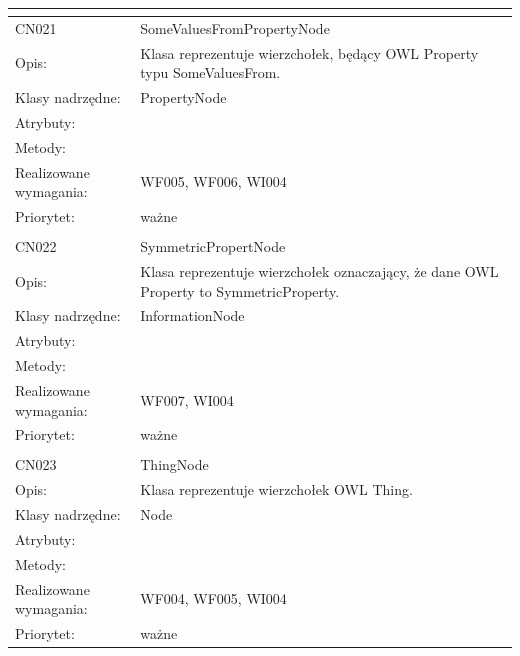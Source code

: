 \begin{center}
\begin{longtable}{|m{3cm}|m{9cm}|}
\multicolumn{2}{c}{} \\
 \hline

CN021 & SomeValuesFromPropertyNode \\ \hline
Opis: & Klasa reprezentuje wierzchołek, będący OWL Property typu SomeValuesFrom. \\ \hline
Klasy nadrzędne: & PropertyNode \\ \hline
Atrybuty: & %
 \\ \hline
Metody: & %
  \\ \hline
Realizowane wymagania: & WF005, WF006, WI004 \\ \hline
Priorytet: & ważne  \\ \hline

\multicolumn{2}{c}{} \\
 \hline

CN022 & SymmetricPropertNode \\ \hline
Opis: & Klasa reprezentuje wierzchołek oznaczający, że dane OWL Property to SymmetricProperty.    \\ \hline
Klasy nadrzędne: & InformationNode     \\ \hline
Atrybuty: & %
 \\ \hline
Metody: & %
  \\ \hline
Realizowane wymagania: & WF007, WI004 \\ \hline
Priorytet: & ważne  \\ \hline

\multicolumn{2}{c}{} \\
 \hline

CN023 & ThingNode \\ \hline
Opis: & Klasa reprezentuje wierzchołek OWL Thing.    \\ \hline
Klasy nadrzędne: & Node     \\ \hline
Atrybuty: & %
 \\ \hline
Metody: & %
  \\ \hline
Realizowane wymagania: & WF004, WF005, WI004 \\ \hline
Priorytet: & ważne  \\ \hline


\end{longtable}
\end{center}
